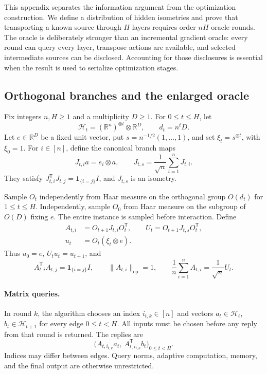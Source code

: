 \documentclass[11pt,letterpaper]{article}
\theoremstyle{definition}
\theoremstyle{remark}
\begin{document}
This appendix separates the information argument from the optimization
construction.  We define a distribution of hidden isometries and prove that
transporting a known source through $H$ layers requires order $nH$ oracle
rounds.  The oracle is deliberately stronger than an incremental gradient
oracle: every round can query every layer, transpose actions are available,
and selected intermediate sources can be disclosed.  Accounting for those
disclosures is essential when the result is used to serialize optimization
stages.

\subsection{Orthogonal branches and the enlarged oracle}
\label{app:source:model}

Fix integers $n,H\geq 1$ and a multiplicity $D\geq 1$.  For
$0\leq t\leq H$, let
\[
  \mathcal H_t=(\mathbb R^n)^{\otimes t}\otimes\mathbb R^D,
  \qquad d_t=n^tD.
\]
Let $e\in\mathbb R^D$ be a fixed unit vector, put
$s=n^{-1/2}(1,\ldots,1)$, and set $\xi_t=s^{\otimes t}$, with
$\xi_0=1$.  For $i\in[n]$, define the canonical branch maps
\[
  J_{t,i}a=e_i\otimes a,
  \qquad
  J_{t,s}=\frac1{\sqrt n}\sum_{i=1}^n J_{t,i}.
\]
They satisfy $J_{t,i}^{\mathsf T}J_{t,j}=\mathbf 1_{\{i=j\}}I$,
and $J_{t,s}$ is an isometry.

Sample $O_t$ independently from Haar measure on the orthogonal group
$O(d_t)$ for $1\leq t\leq H$.  Independently, sample $O_0$ from Haar
measure on the subgroup of $O(D)$ fixing $e$.  The entire instance is
sampled before interaction.  Define
\begin{equation}
  \begin{split}
    A_{t,i}&=O_{t+1}J_{t,i}O_t^{\mathsf T},
    \qquad U_t=O_{t+1}J_{t,s}O_t^{\mathsf T},\\
    u_t&=O_t(\xi_t\otimes e).
  \end{split}
  \label{eq:source-law}
\end{equation}
Thus $u_0=e$, $U_tu_t=u_{t+1}$, and
\[
  A_{t,i}^{\mathsf T}A_{t,j}=\mathbf 1_{\{i=j\}}I,
  \qquad \|A_{t,i}\|_{\mathrm{op}}=1,
  \qquad \frac1n\sum_{i=1}^n A_{t,i}=\frac1{\sqrt n}U_t.
\]

\paragraph{Matrix queries.}
In round $k$, the algorithm chooses an index $i_{t,k}\in[n]$ and
vectors $a_t\in\mathcal H_t$, $b_t\in\mathcal H_{t+1}$ for every
edge $0\leq t<H$.  All inputs must be chosen before any reply from
that round is returned.  The replies are
\begin{equation}
  \bigl(A_{t,i_{t,k}}a_t,\ A_{t,i_{t,k}}^{\mathsf T}b_t\bigr)_{0\leq t<H}.
  \label{eq:source-round}
\end{equation}
Indices may differ between edges.  Query norms, adaptive computation,
memory, and the final output are otherwise unrestricted.
\end{document}
